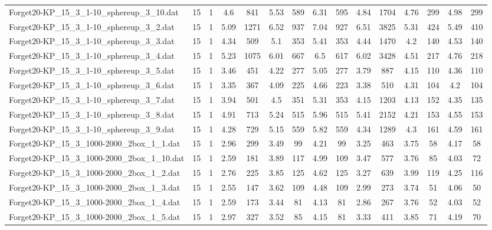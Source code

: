 \begin{table}[!ht]
{\begin{tabular}{lcccccccccccccc}
Forget20-KP\_15\_3\_1-10\_sphereup\_3\_10.dat & 15 & 1 & 4.6 & 841 & 5.53 & 589 & 6.31 & 595 & 4.84 & 1704 & 4.76 & 299 & 4.98 & 299 \\
Forget20-KP\_15\_3\_1-10\_sphereup\_3\_2.dat & 15 & 1 & 5.09 & 1271 & 6.52 & 937 & 7.04 & 927 & 6.51 & 3825 & 5.31 & 424 & 5.49 & 410 \\
Forget20-KP\_15\_3\_1-10\_sphereup\_3\_3.dat & 15 & 1 & 4.34 & 509 & 5.1 & 353 & 5.41 & 353 & 4.44 & 1470 & 4.2 & 140 & 4.53 & 140 \\
Forget20-KP\_15\_3\_1-10\_sphereup\_3\_4.dat & 15 & 1 & 5.23 & 1075 & 6.01 & 667 & 6.5 & 617 & 6.02 & 3428 & 4.51 & 217 & 4.76 & 218 \\
Forget20-KP\_15\_3\_1-10\_sphereup\_3\_5.dat & 15 & 1 & 3.46 & 451 & 4.22 & 277 & 5.05 & 277 & 3.79 & 887 & 4.15 & 110 & 4.36 & 110 \\
Forget20-KP\_15\_3\_1-10\_sphereup\_3\_6.dat & 15 & 1 & 3.35 & 367 & 4.09 & 225 & 4.66 & 223 & 3.38 & 510 & 4.31 & 104 & 4.2 & 104 \\
Forget20-KP\_15\_3\_1-10\_sphereup\_3\_7.dat & 15 & 1 & 3.94 & 501 & 4.5 & 351 & 5.31 & 353 & 4.15 & 1203 & 4.13 & 152 & 4.35 & 135 \\
Forget20-KP\_15\_3\_1-10\_sphereup\_3\_8.dat & 15 & 1 & 4.91 & 713 & 5.24 & 515 & 5.96 & 515 & 5.41 & 2152 & 4.21 & 153 & 4.55 & 153 \\
Forget20-KP\_15\_3\_1-10\_sphereup\_3\_9.dat & 15 & 1 & 4.28 & 729 & 5.15 & 559 & 5.82 & 559 & 4.34 & 1289 & 4.3 & 161 & 4.59 & 161 \\
Forget20-KP\_15\_3\_1000-2000\_2box\_1\_1.dat & 15 & 1 & 2.96 & 299 & 3.49 & 99 & 4.21 & 99 & 3.25 & 463 & 3.75 & 58 & 4.17 & 58 \\
Forget20-KP\_15\_3\_1000-2000\_2box\_1\_10.dat & 15 & 1 & 2.59 & 181 & 3.89 & 117 & 4.99 & 109 & 3.47 & 577 & 3.76 & 85 & 4.03 & 72 \\
Forget20-KP\_15\_3\_1000-2000\_2box\_1\_2.dat & 15 & 1 & 2.76 & 225 & 3.85 & 125 & 4.62 & 125 & 3.27 & 639 & 3.99 & 119 & 4.25 & 116 \\
Forget20-KP\_15\_3\_1000-2000\_2box\_1\_3.dat & 15 & 1 & 2.55 & 147 & 3.62 & 109 & 4.48 & 109 & 2.99 & 273 & 3.74 & 51 & 4.06 & 50 \\
Forget20-KP\_15\_3\_1000-2000\_2box\_1\_4.dat & 15 & 1 & 2.59 & 173 & 3.44 & 81 & 4.13 & 81 & 2.86 & 267 & 3.76 & 52 & 4.03 & 52 \\
Forget20-KP\_15\_3\_1000-2000\_2box\_1\_5.dat & 15 & 1 & 2.97 & 327 & 3.52 & 85 & 4.15 & 81 & 3.33 & 411 & 3.85 & 71 & 4.19 & 70 \\

\end{tabular}}
\end{table}

